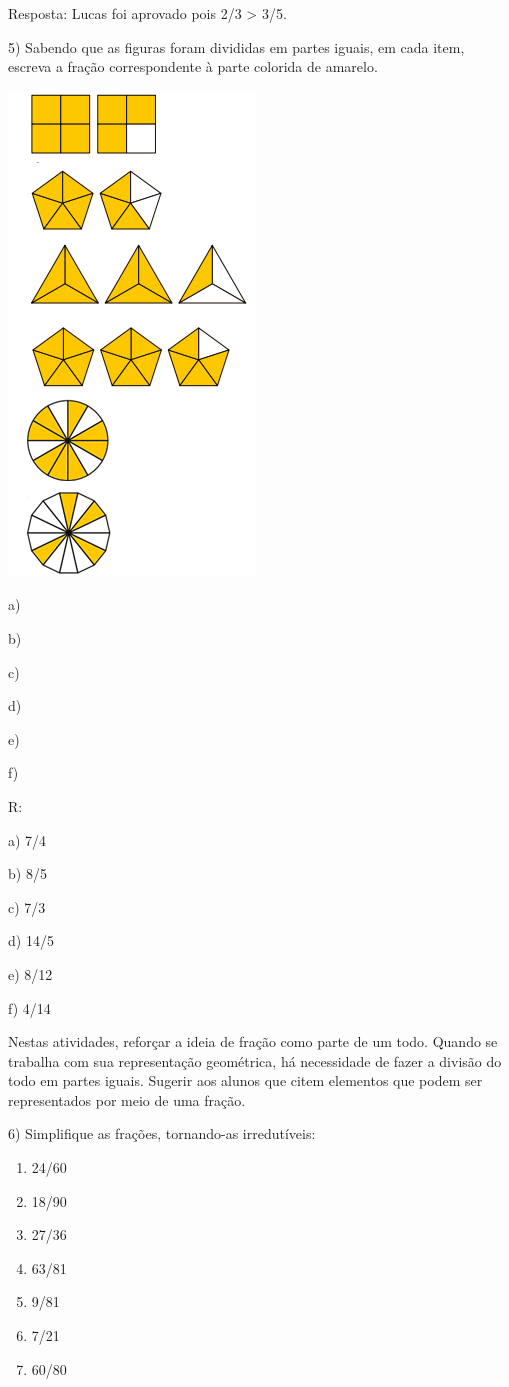 Resposta: Lucas foi aprovado pois 2/3 \textgreater{} 3/5.

5) Sabendo que as figuras foram divididas em partes iguais, em cada
item, escreva a fração correspondente à parte colorida de amarelo.

\includegraphics[width=2.57292in,height=5.0625in]{./imgSAEB_6_MAT/media/image32.png}

a)

b)

c)

d)

e)

f)

R:

a) 7/4

b) 8/5

c) 7/3

d) 14/5

e) 8/12

f) 4/14

Nestas atividades, reforçar a ideia de fração como parte de um todo.
Quando se trabalha com sua representação geométrica, há necessidade de
fazer a divisão do todo em partes iguais. Sugerir aos alunos que citem
elementos que podem ser representados por meio de uma fração.

6) Simplifique as frações, tornando-as irredutíveis:

\begin{enumerate}
\def\labelenumi{\alph{enumi})}
\item
  24/60
\item
  18/90
\item
  27/36
\item
  63/81
\item
  9/81
\item
  7/21
\item
  60/80
\end{enumerate}

